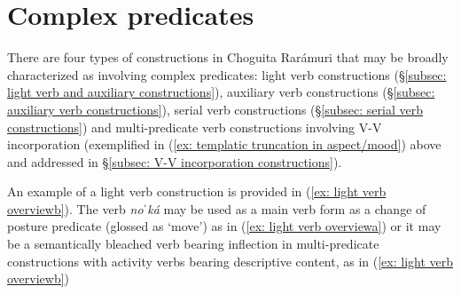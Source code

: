     \label{ex: clause chaining overviewa}
        \label{ex: clause chaining overviewb}
    \z
\z

\section{Complex predicates}
\label{sec: complex predicates}

There are four types of constructions in Choguita Rarámuri that may be broadly characterized as involving complex predicates: light verb constructions (§\ref{subsec: light verb and auxiliary constructions}), auxiliary verb constructions (§\ref{subsec: auxiliary verb constructions}), serial verb constructions (§\ref{subsec: serial verb constructions}) and multi-predicate verb constructions involving V-V incorporation (exemplified in (\ref{ex: templatic truncation in aspect/mood}) above and addressed in §\ref{subsec: V-V incorporation constructions}).

An example of a light verb construction is provided in (\ref{ex: light verb overviewb}). The verb \textit{noˈká} may be used as a main verb form as a change of posture predicate (glossed as ‘move’) as in (\ref{ex: light verb overviewa}) or it may be a semantically bleached verb bearing inflection in multi-predicate constructions with activity verbs bearing descriptive content, as in (\ref{ex: light verb overviewb})

